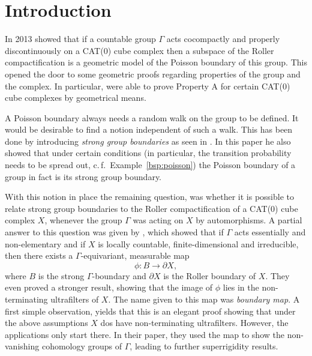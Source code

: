 \section{Introduction}
\label{sec:introduction}


In 2013 \textcite{MR3095714} showed that if a countable group \(\Gamma\) acts cocompactly and properly discontinuously on a CAT(0) cube complex then a subspace of the Roller compactification is a geometric model of the Poisson boundary of this group. This opened the door to some geometric proofs regarding properties of the group and the complex. In particular, \textcite{MR3095714} were able to prove Property A for certain CAT(0) cube complexes by geometrical means.

A Poisson boundary always needs a random walk on the group to be defined. It would be desirable to find a notion independent of such a walk. This has been done by introducing \emph{strong group boundaries} as seen in \textcite{MR2006560}. In this paper he also showed that under certain conditions (in particular, the transition probability needs to be spread out, c.\,f.\ Example~\ref{bsp:poisson}) the Poisson boundary of a group in fact is its strong group boundary.

With this notion in place the remaining question, was whether it is possible to relate strong group boundaries to the Roller compactification of a CAT(0) cube complex \(X\), whenever the group \(\Gamma\) was acting on \(X\) by automorphisms. A partial answer to this question was given by \textcite{MR3509968}, which showed that if \(\Gamma\) acts essentially and non-elementary and if \(X\) is locally countable, finite-dimensional and irreducible, then there exists a \(\Gamma\)-equivariant, measurable map
\[
  \phi\colon B \to \partial X,
\]
where \(B\) is the strong \(\Gamma\)-boundary and \(\partial X\) is the Roller boundary of \(X\). They even proved a stronger result, showing that the image of \(\phi\) lies in the non-terminating ultrafilters of \(X\). The name given to this map was \emph{boundary map}. A first simple observation, yields that this is an elegant proof showing that under the above assumptions \(X\) dos have non-terminating ultrafilters. However, the applications only start there. In their paper, they used the map to show the non-vanishing cohomology groups of \(\Gamma\), leading to further superrigidity results.

